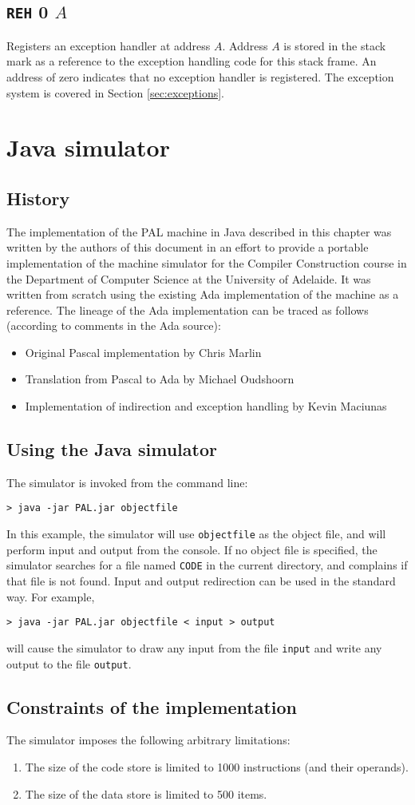 \documentclass[a4paper,10pt]{report}
\begin{document}
\section{\texttt{REH} 0 $A$}
\label{sec:instr:REH}
Registers an exception handler at address $A$.  Address $A$ is stored
in the stack mark as a reference to the exception handling code for
this stack frame.  An address of zero indicates that no exception
handler is registered.  The exception system is covered in Section
\ref{sec:exceptions}.

\chapter{Java simulator}
\section{History}
The implementation of the PAL machine in Java described in this
chapter was written by the authors of this document in an effort to
provide a portable implementation of the machine simulator for the
Compiler Construction course in the Department of Computer Science at
the University of Adelaide.  It was written from scratch using the
existing Ada implementation of the machine as a reference.  The
lineage of the Ada implementation can be traced as follows (according
to comments in the Ada source):
\begin{itemize}
\item Original Pascal implementation by Chris Marlin
\item Translation from Pascal to Ada by Michael Oudshoorn
\item Implementation of indirection and exception handling by Kevin Maciunas
\end{itemize}

\section{Using the Java simulator}
The simulator is invoked from the command line:
\begin{verbatim}
> java -jar PAL.jar objectfile
\end{verbatim}
In this example, the simulator will use \texttt{objectfile} as the
object file, and will perform input and output from the console.  If
no object file is specified, the simulator searches for a file named
\texttt{CODE} in the current directory, and complains if that file is
not found.  Input and output redirection can be used in the standard
way.  For example,
\begin{verbatim}
> java -jar PAL.jar objectfile < input > output
\end{verbatim}
will cause the simulator to draw any input from the file
\texttt{input} and write any output to the file \texttt{output}.

\section{Constraints of the implementation}
The simulator imposes the following arbitrary limitations:
\begin{enumerate}
\item The size of the code store is limited to 1000 instructions (and
  their operands).
\item The size of the data store is limited to 500 items.
\end{enumerate}
\end{document}
